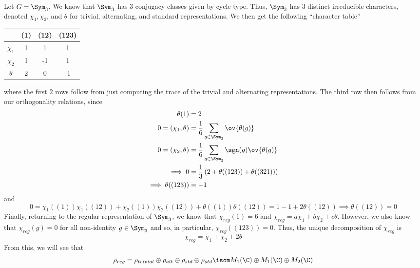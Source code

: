 \documentclass[11pt,leqno,oneside]{amsbook}
\numberwithin{thm}{section}
\begin{document}
\begin{example}
  Let \(G = \Sym_3\). We know that \(\Sym_3\) has \(3\) conjugacy
  classes given by cycle type. Thus, \(\Sym_3\) has \(3\) distinct
  irreducible characters, denoted \(\chi_1, \chi_2\), and \(\theta\)
  for trivial, alternating, and standard representations. We then get
  the following ``character table'' \\
  \begin{center}
    \begin{tabular}{c|ccc}
      &(1)&(12)&(123) \\
      \hline
      \(\chi_1\) &1&1&1 \\
      \(\chi_2\) &1&-1&1\\
      \(\theta\) &2&0&-1
    \end{tabular}
  \end{center}
  where the first \(2\) rows follow from just computing the trace of
  the trivial and alternating representations. The third row then
  follows from our orthogonality relations, since
  \begin{align*}
    \theta(1) & = 2 \\
    0 = (\chi_1,\theta) & = \frac{1}{6} \sum_{g \in \Sym_3}
    \ov{\theta(g)} \\
    0 = (\chi_2, \theta) & = \frac{1}{6} \sum_{g \in \Sym_3} \sgn(g)
    \ov{\theta(g)} \\
    \implies 0 & = \frac{1}{3}\left( 2 + \theta((123)) + \theta((321))
    \right) \\
    \implies \theta((123)) & = -1
  \end{align*}
  and \[
    0 = \chi_1((1)) \chi_1((12)) + \chi_2((1)) \chi_2((12)) +
    \theta((1)) \theta((12)) = 1 - 1 + 2 \theta((12)) \implies
    \theta((12)) = 0
  \]
  Finally, returning to the regular representation of \(\Sym_3\), we
  know that \(\chi_{reg}(1) = 6\) and \(\chi_{reg} = a \chi_1 + b
  \chi_2 + c \theta\). However, we also know that \(\chi_{reg}(g) =
  0\) for all non-identity \(g \in \Sym_3\) and so, in particular,
  \(\chi_{reg}((123)) = 0\). Thus, the unique
  decomposition of \(\chi_{reg}\) is \[
    \chi_{reg} = \chi_1 + \chi_2 + 2 \theta
  \]
  From this, we will see that \[
    \rho_{reg} = \rho_{trivial} \oplus \rho_{alt} \oplus \rho_{std}
    \oplus \rho_{std} \isom M_1(\C) \oplus M_1(\C) \oplus M_2(\C)
  \]
\end{example}
\end{document}
